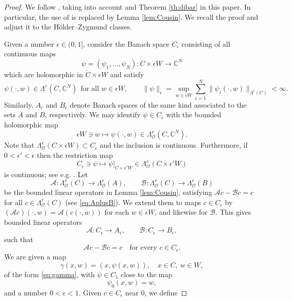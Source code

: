\documentclass[11pt]{amsart}
\numberwithin{equation}{section}
\theoremstyle{definition}
\newcommand\Acal{\mathcal{A}}
\newcommand\Bcal{\mathcal{B}}
\newcommand\Oscr{\mathscr{O}}
\newcommand\C{\mathbb{C}}
\begin{document}
\begin{proof}
We follow \cite[proof of Proposition 5.8.1]{Forstneric2017E}, 
taking into account \cite[Remark 5.8.3 (B), p.\ 238]{Forstneric2017E}
and Theorem \ref{th:dibar} in this paper. In particular, 
the use of \cite[Lemma 5.8.2, p.\ 236]{Forstneric2017E}
is replaced by Lemma \ref{lem:Cousin}. We recall the proof 
and adjust it to the H\"older--Zygmund classes.

Given a number $\epsilon\in (0,1]$, consider the Banach space
$C_{\epsilon}$ consisting of all continuous maps
\[
	\psi=(\psi_1,\ldots,\psi_N):C\times \epsilon W \to \C^N
\] 
which are holomorphic in $\mathring C\times \epsilon W$ and satisfy
\[
	\psi(\cdotp,w)\in \Lambda^r(C,\C^N)\ \ 
	\text{for all $w\in \epsilon W$},
	\qquad
	\|\psi\|_{\epsilon} = \sup_{w\in \epsilon W} 
	\sum_{i=1}^N \|\psi_i(\cdotp,w)\|_{\Lambda^r (C)} < \infty.
\]
Similarly, $A_{\epsilon}$ and $B_{\epsilon}$ denote Banach spaces
of the same kind associated to the sets $A$ and $B$, respectively. 
We may identify $\psi\in C_\epsilon$ with the bounded 
holomorphic map
\[
	\epsilon W\ni w \mapsto 
	\psi(\cdotp,w)\in  \Lambda^r_\Oscr (C,\C^N).
\]
Note that $\Lambda^r_\Oscr(C\times \epsilon W) \subset C_\epsilon$
and the inclusion is continuous. Furthermore, if $0<\epsilon'<\epsilon$ 
then the restriction map 
\begin{equation}\label{eq:restriction}
	C_\epsilon\ni \psi\mapsto \psi|_{C\times \epsilon'W} 
	\in \Lambda^r_\Oscr(C\times \epsilon' W) 
\end{equation}
is continuous; see e.g. \cite[Theorem, p.\ 63]{BesovIlinNikolskii1979}.
Let 
\[
	\Acal:\Lambda^r_\Oscr(C)\to \Lambda^r_\Oscr(A),
	\qquad  
	\Bcal:\Lambda^r_\Oscr(C)\to \Lambda^r_\Oscr(B)
\]
be the bounded linear operators in Lemma \ref{lem:Cousin}, satisfying
$\Acal c - \Bcal c=c$ for all $c\in \Lambda^r_\Oscr(C)$ 
(see \eqref{eq:AplusB}). We extend them to maps $c\in C_\epsilon$ by 
$(\Acal c)(\cdotp,w) = \Acal (c(\cdotp,w))$ for each $w\in\epsilon W$,
and likewise for $\Bcal$. This gives bounded linear operators
\[
	\Acal:C_\epsilon \to A_\epsilon,\qquad \Bcal:C_\epsilon \to B_\epsilon,
\]
such that
\[
	\Acal c - \Bcal c=c \quad\text{for every $c\in C_\epsilon$.}
\]
We are given a map 
\begin{equation}\label{eq:gamma1}
	\gamma(x,w)=(x,\psi(x,w)),\quad x\in C,\ w\in W,
\end{equation}
of the form \eqref{eq:gamma}, with $\psi\in C_{1}$ close to the map
\[
	\psi_0(x,w)=w, 
\]
and a number $0<\epsilon <1$. Given $c\in C_{\epsilon}$ near $0$, we define 

\end{proof}
\end{document}
